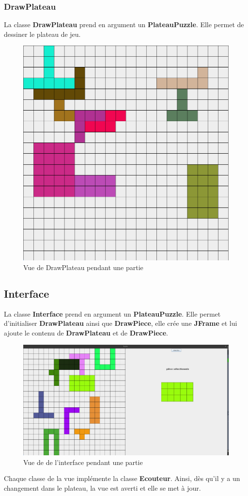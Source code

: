 \documentclass[a4paper,12pt]{article} %
\begin{document}
\subsubsection{DrawPlateau}
La classe \textbf{DrawPlateau} prend en argument un \textbf{PlateauPuzzle}. Elle permet de dessiner le plateau de jeu.

\begin{figure}[ht]
    \centering
    \includegraphics[width=0.5\linewidth]{images/plateauInterface.png}
    \caption{Vue de DrawPlateau pendant une partie}
\end{figure}

\subsection{Interface}
La classe \textbf{Interface} prend en argument un \textbf{PlateauPuzzle}. Elle permet d'initialiser \textbf{DrawPlateau} ainsi que \textbf{DrawPiece}, elle crée une \textbf{JFrame} et lui ajoute le contenu de \textbf{DrawPlateau} et de \textbf{DrawPiece}.

\begin{figure}[ht]
    \centering
    \includegraphics[width=0.5\linewidth]{images/partie.png}
    \caption{Vue de de l'interface pendant une partie}
\end{figure}

\par Chaque classe de la vue implémente la classe \textbf{Ecouteur}. Ainsi, dès qu'il y a un changement dans le plateau, la vue est averti et elle se met à jour.
\end{document}
